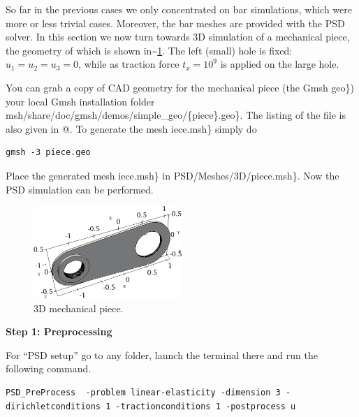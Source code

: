 \newcommand{\psd}[1]{{\small\sffamily{\color{blue!60}#1}}}

So far in the previous cases we only concentrated on bar simulations,
which were more or less trivial cases. Moreover, the bar meshes are
provided with the PSD solver. In this section we now turn towards 3D
simulation of a mechanical piece, the geometry of which is shown
in\textasciitilde{}\cref{fig:mechanicalpiecegeo}. The left (small) hole
is fixed: \(u_1=u_2=u_3=0\), while as traction force \(t_x=10^9\) is
applied on the large hole.

You can grab a copy of CAD geometry for the mechanical piece (the Gmsh
\psd .geo\}) your local Gmsh installation folder
\psd gmsh/share/doc/gmsh/demos/simple\_geo/\{piece\}.geo\}. The listing
of the file is also given in @. To generate the mesh \psd piece.msh\}
simply do

\begin{lstlisting}[style=BashInputStyle]
gmsh -3 piece.geo
\end{lstlisting}

Place the generated mesh \psd piece.msh\} in
\psd /PSD/Meshes/3D/piece.msh\}. Now the PSD simulation can be
performed.

\begin{figure}[h]
    \centering
    \includegraphics[align=b,width=0.5\textwidth]{./Images/3d-mechanical.png}
    \caption{3D mechanical piece.}
    \label{fig:mechanicalpiecegeo}
\end{figure}

\textbf{Step 1: Preprocessing}

For ``PSD setup'' go to any folder, launch the terminal there and run
the following command.

\begin{lstlisting}[style=BashInputStyle]
PSD_PreProcess  -problem linear-elasticity -dimension 3 -dirichletconditions 1 -tractionconditions 1 -postprocess u
\end{lstlisting}

